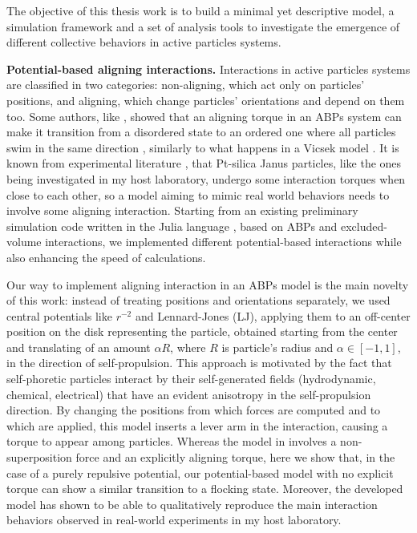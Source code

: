 \documentclass[a4paper, notitlepage]{report} %
\begin{document}
	The objective of this thesis work is to build a minimal yet descriptive model, a simulation framework and a set of analysis tools to investigate the emergence of different collective behaviors in active particles systems.
	
	\textbf{Potential-based aligning interactions.}
	Interactions in active particles systems are classified in two categories: non-aligning, which act only on particles' positions, and aligning, which change particles' orientations and depend on them too.
	Some authors, like \citeauthor{martin-gomez_collective_2018}, showed that an aligning torque in an ABPs system can make it transition from a disordered state to an ordered one where all particles swim in the same direction \cite{martin-gomez_collective_2018}, similarly to what happens in a Vicsek model \cite{vicsek_novel_1995}.
	It is known from experimental literature \cite{singh_pair_2024}, that Pt-silica Janus particles, like the ones being investigated in my host laboratory, undergo some interaction torques when close to each other, so a model aiming to mimic real world behaviors needs to involve some aligning interaction.
	Starting from an existing preliminary simulation code written in the Julia language \cite{julia}, based on ABPs and excluded-volume interactions, we implemented different potential-based interactions while also enhancing the speed of calculations.
	
	Our way to implement aligning interaction in an ABPs model is the main novelty of this work: instead of treating positions and orientations separately, we used central potentials like $r^{-2}$ and Lennard-Jones (LJ), applying them to an off-center position on the disk representing the particle, obtained starting from the center and translating of an amount $\alpha R$, where $R$ is particle's radius and $\alpha \in [-1,1]$, in the direction of self-propulsion.
	This approach is motivated by the fact that self-phoretic particles interact by their self-generated fields (hydrodynamic, chemical, electrical) that have an evident anisotropy in the self-propulsion direction.
	By changing the positions from which forces are computed and to which are applied, this model inserts a lever arm in the interaction, causing a torque to appear among particles.
	Whereas the model in \cite{martin-gomez_collective_2018} involves a non-superposition force and an explicitly aligning torque, here we show that, in the case of a purely repulsive potential, our potential-based model with no explicit torque can show a similar transition to a flocking state.
	Moreover, the developed model has shown to be able to qualitatively reproduce the main interaction behaviors observed in real-world experiments in my host laboratory.
	
\end{document}
